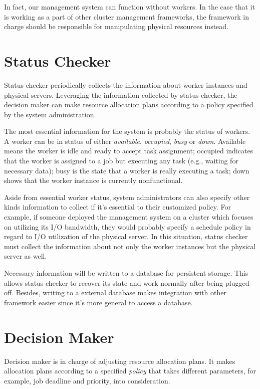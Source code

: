 In fact, our management system can function without workers.
In the case that it is working as a part of other cluster management
frameworks, the framework in charge should be responsible for
manipulating physical resources instead.

\section{Status Checker}

Status checker periodically collects the information about worker
instances and physical servers.
Leveraging the information collected by status checker, the decision
maker can make resource allocation plans according to a policy specified
by the system administration.

The most essential information for the system is probably the status of
workers.
A worker can be in status of either \emph{available}, \emph{occupied},
\emph{busy} or \emph{down}.
Available means the worker
is idle and ready to accept task assignment; occupied indicates that the
worker is assigned to a job but executing any task (e.g., waiting for
necessary data); busy is the state that a worker is really executing a
task; down shows that the worker instance is currently nonfunctional. 

Aside from essential worker status, system administrators can also
specify other kinds information to collect if it's essential to  their
customized policy.
For example, if someone deployed the management system on a cluster
which focuses on utilizing its I/O bandwidth, they would probably
specify a schedule policy in regard to I/O utilization of the physical
server.
In this situation, status checker must collect the information about
not only the worker instances but the physical server as well.

Necessary information will be written to a database for persistent
storage.
This allows status checker to recover its state and work normally after
being plugged off.
Besides, writing to a external database makes integration with other
framework easier since it's more general to access a database.

\section{Decision Maker}

Decision maker is in charge of adjusting resource allocation plans.
It
makes allocation plans according to a specified \emph{policy} that takes
different parameters, for example, job deadline and priority, into
consideration. 

